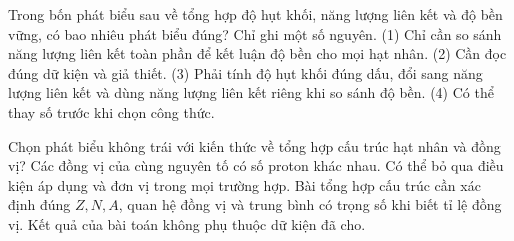 \begin{ex}
Trong bốn phát biểu sau về tổng hợp độ hụt khối, năng lượng liên kết và độ bền vững, có bao nhiêu phát biểu đúng? Chỉ ghi một số nguyên. (1) Chỉ cần so sánh năng lượng liên kết toàn phần để kết luận độ bền cho mọi hạt nhân. (2) Cần đọc đúng dữ kiện và giả thiết. (3) Phải tính độ hụt khối đúng dấu, đổi sang năng lượng liên kết và dùng năng lượng liên kết riêng khi so sánh độ bền. (4) Có thể thay số trước khi chọn công thức.
\end{ex}

\begin{ex}
Chọn phát biểu không trái với kiến thức về tổng hợp cấu trúc hạt nhân và đồng vị?
\choice
{Các đồng vị của cùng nguyên tố có số proton khác nhau.}
{Có thể bỏ qua điều kiện áp dụng và đơn vị trong mọi trường hợp.}
{\True Bài tổng hợp cấu trúc cần xác định đúng $Z,N,A$, quan hệ đồng vị và trung bình có trọng số khi biết tỉ lệ đồng vị.}
{Kết quả của bài toán không phụ thuộc dữ kiện đã cho.}
\end{ex}


